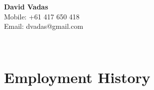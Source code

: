 \documentclass[]{article}
\begin{document}
\hrulefill
\begin{center}
\Huge{\textbf{David Vadas}}\\
\vspace{0.5cm}
\normalsize
Mobile: +61 417 650 418\\
Email: dvadas@gmail.com\\ %
\end{center}
\hrulefill
\\
\vspace{0.08in}

\section*{Employment History}
\setlength{\tabcolsep}{0.1cm}
\end{document}
